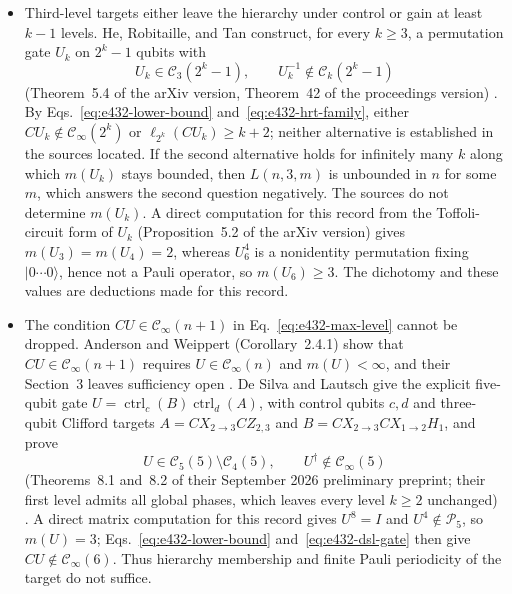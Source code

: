 \begin{itemize}
  \item Third-level targets either leave the hierarchy under control or gain at
  least $k-1$ levels.  He, Robitaille, and Tan construct, for every $k\geq3$, a
  permutation gate $U_k$ on $2^k-1$ qubits with
  \begin{equation}
    U_k\in\mathcal C_3(2^k-1),
    \qquad
    U_k^{-1}\notin\mathcal C_k(2^k-1)
    \label{eq:e432-hrt-family}
  \end{equation}
  (Theorem~5.4 of the arXiv version, Theorem~42 of the proceedings version)
  .  By
  Eqs.~\eqref{eq:e432-lower-bound} and~\eqref{eq:e432-hrt-family}, either
  $CU_k\notin\mathcal C_\infty(2^k)$ or $\ell_{2^k}(CU_k)\geq k+2$; neither
  alternative is established in the sources located.  If the second
  alternative holds for infinitely many $k$ along which $m(U_k)$ stays
  bounded, then $L(n,3,m)$ is unbounded in $n$ for some $m$, which answers the
  second question negatively.  The sources do not determine $m(U_k)$.  A
  direct computation for this record from the Toffoli-circuit form of $U_k$
  (Proposition~5.2 of the arXiv version) gives $m(U_3)=m(U_4)=2$, whereas
  $U_6^4$ is a nonidentity permutation fixing $|0\cdots0\rangle$, hence not a
  Pauli operator, so $m(U_6)\geq3$.  The dichotomy and these values are
  deductions made for this record.

  \item The condition $CU\in\mathcal C_\infty(n+1)$ in
  Eq.~\eqref{eq:e432-max-level} cannot be dropped.  Anderson and Weippert
  (Corollary~2.4.1) show that $CU\in\mathcal C_\infty(n+1)$ requires
  $U\in\mathcal C_\infty(n)$ and $m(U)<\infty$, and their Section~3 leaves
  sufficiency open .  De Silva
  and Lautsch give the explicit five-qubit gate
  $U=\operatorname{ctrl}_c(B)\operatorname{ctrl}_d(A)$, with control qubits
  $c,d$ and three-qubit Clifford targets $A=CX_{2\to3}CZ_{2,3}$ and
  $B=CX_{2\to3}CX_{1\to2}H_1$, and prove
  \begin{equation}
    U\in\mathcal C_5(5)\setminus\mathcal C_4(5),
    \qquad
    U^\dagger\notin\mathcal C_\infty(5)
    \label{eq:e432-dsl-gate}
  \end{equation}
  (Theorems~8.1 and~8.2 of their September 2026 preliminary preprint; their
  first level admits all global phases, which leaves every level $k\geq2$
  unchanged) .  A direct matrix
  computation for this record gives $U^8=I$ and $U^4\notin\mathcal P_5$, so
  $m(U)=3$; Eqs.~\eqref{eq:e432-lower-bound} and~\eqref{eq:e432-dsl-gate} then
  give $CU\notin\mathcal C_\infty(6)$.  Thus hierarchy membership and finite
  Pauli periodicity of the target do not suffice.
\end{itemize}

